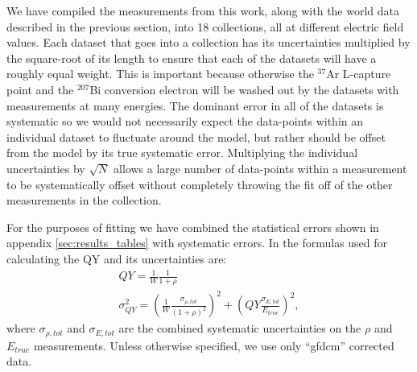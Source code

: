 We have compiled the measurements from this work, along with the world data described in the previous section, into 18 collections, all at different electric field values. Each dataset that goes into a collection has its uncertainties multiplied by the square-root of its length to ensure that each of the datasets will have a roughly equal weight. This is important because otherwise the $^{37}$Ar L-capture point and the $^{207}$Bi conversion electron will be washed out by the datasets with measurements at many energies. The dominant error in all of the datasets is systematic so we would not necessarily expect the data-points within an individual dataset to fluctuate around the model, but rather should be offset from the model by its true systematic error. Multiplying the individual uncertainties by $\sqrt{N}$ allows a large number of data-points within a measurement to be systematically offset without completely throwing the fit off of the other measurements in the collection.

For the purposes of fitting we have combined the statistical errors shown in appendix \ref{sec:results_tables} with systematic errors. In the formulas used for calculating the QY and its uncertainties are:
\begin{equation}
\begin{split}
QY=\frac{1}{W}\frac{1}{1+\rho}\\
\sigma_{QY}^2=\left(\frac{1}{W}\frac{\sigma_{\rho,tot}}{(1+\rho)^2}\right)^2+\left(QY\frac{\sigma_{E,tot}}{E_{true}}\right)^2,
\end{split}
\end{equation}
where $\sigma_{\rho,tot}$ and $\sigma_{E,tot}$ are the combined systematic uncertainties on the $\rho$ and $E_{true}$ measurements. Unless otherwise specified, we use only ``gfdcm'' corrected data.


